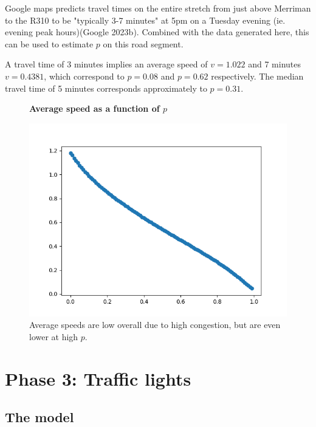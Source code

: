 \documentclass{article}
\begin{document}
Google maps predicts travel times on the entire stretch from just above Merriman to the R310 to be "typically 3-7 minutes" at 5pm on a Tuesday evening (ie. evening peak hours)(Google 2023b). Combined with the data generated here, this can be used to estimate $p$ on this road segment.

A travel time of 3 minutes implies an average speed of $v=1.022$ and 7 minutes $v=0.4381$, which correspond to $p=0.08$ and $p=0.62$ respectively. The median travel time of 5 minutes corresponds approximately to $p=0.31$.

\begin{figure}
\textbf{\large Average speed as a function of $p$}\par\medskip
{}
\includegraphics[scale = 0.55, left]{./data/phase2/v_vs_p.png}
\vspace*{0.1cm}\hspace*{4.5cm}{\large $p$}
\caption{\label{fig} Average speeds are low overall due to high congestion, but are even lower at high $p$.}
\end{figure}

\section*{Phase 3: Traffic lights}

\subsection*{The model}
\end{document}
